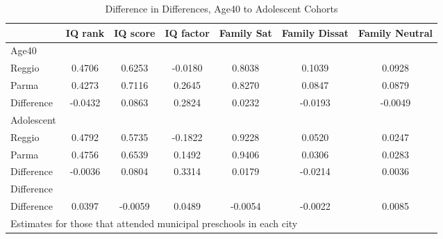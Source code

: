 \begin{table}[htbp]\centering
\caption{Difference in Differences, Age40 to Adolescent Cohorts}
\begin{tabular}{l*{6}{c}}
\hline\hline
            &     IQ rank&    IQ score&   IQ factor&  Family Sat&Family Dissat&Family Neutral\\
\hline
Age40       &            &            &            &            &            &            \\
Reggio      &      0.4706&      0.6253&     -0.0180&      0.8038&      0.1039&      0.0928\\
Parma       &      0.4273&      0.7116&      0.2645&      0.8270&      0.0847&      0.0879\\
Difference  &     -0.0432&      0.0863&      0.2824&      0.0232&     -0.0193&     -0.0049\\
\hline
Adolescent  &            &            &            &            &            &            \\
Reggio      &      0.4792&      0.5735&     -0.1822&      0.9228&      0.0520&      0.0247\\
Parma       &      0.4756&      0.6539&      0.1492&      0.9406&      0.0306&      0.0283\\
Difference  &     -0.0036&      0.0804&      0.3314&      0.0179&     -0.0214&      0.0036\\
\hline
Difference  &            &            &            &            &            &            \\
Difference  &      0.0397&     -0.0059&      0.0489&     -0.0054&     -0.0022&      0.0085\\
\hline\hline
\multicolumn{7}{l}{\footnotesize Estimates for those that attended municipal preschools in each city}\\
\end{tabular}
\end{table}
